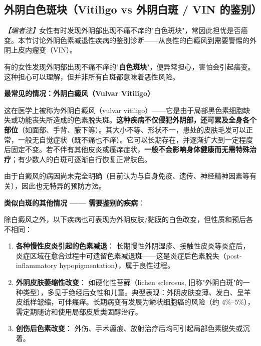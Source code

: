 \begin{enumerate}
\subsection{外阴白色斑块（Vitiligo vs 外阴白斑 / VIN 的鉴别）}

\noindent\textit{【编者注】}女性有时发现外阴部出现不痛不痒的"白色斑块"，常因此担忧是否癌变。本节讨论外阴色素减退性疾病的鉴别诊断——从良性的白癜风到需要警惕的外阴上皮内瘤变（VIN）。

\vspace{0.5em}
有的女性发现外阴部出现不痛不痒的"\textbf{白色斑块}"，便异常担心，害怕会引起癌变。这种担心可以理解，但并非所有白斑都意味着恶性风险。

\vspace{0.5em}
\noindent\textbf{最常见的情况：外阴白癜风（Vulvar Vitiligo）}

这在医学上被称为外阴白癜风（vulvar vitiligo）——它是由于局部黑色素细胞缺失或功能丧失所造成的色素脱失斑。\textbf{这种疾病不仅侵犯外阴部，还可累及全身各个部位}（如面部、手背、腋下等）。其大小不等、形状不一，患处的皮肤毛发可以正常，一般无自觉症状（既不痛也不痒）。它可以长期存在，并逐渐扩大到一定程度后固定不变。若不伴有其他皮炎或瘙痒症状，\textbf{一般不会影响身体健康而无需特殊治疗}；有少数人的白斑可逐渐自行恢复正常肤色。

由于白癜风的病因尚未完全明确（目前认为与自身免疫、遗传、神经精神因素等有关），因此也无特异的预防方法。

\vspace{0.5em}
\noindent\textbf{类似白斑的其他情况 —— 需要鉴别的疾病}：

除白癜风之外，以下疾病也可表现为外阴皮肤/黏膜的白色改变，但性质和预后各不相同：

\begin{enumerate}
	\item \textbf{各种慢性皮炎引起的色素减退}：
	长期慢性外阴湿疹、接触性皮炎等炎症后，炎症区域在愈合过程中可遗留色素减退斑——这是炎症后色素脱失（post-inflammatory hypopigmentation），属于良性过程。

	\item \textbf{外阴皮肤萎缩性改变}：
	如硬化性苔藓（lichen sclerosus, 旧称"外阴白斑"的一种类型），多见于绝经后女性和儿童。典型表现：外阴皮肤变薄、发白、呈羊皮纸样皱缩，可伴瘙痒。长期病变有发展为鳞状细胞癌的风险（约 $4\%$--$5\%$），需定期随访和使用局部皮质类固醇治疗。

	\item \textbf{创伤后色素改变}：
	外伤、手术瘢痕、放射治疗后均可引起局部色素脱失或沉着。


\end{enumerate}
\end{enumerate}
